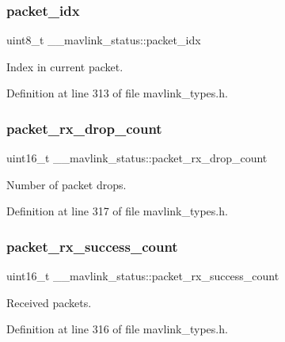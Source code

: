 \subsubsection{\texorpdfstring{packet\_idx}{packet\_idx}}
{\footnotesize\ttfamily uint8\+\_\+t \+\_\+\+\_\+mavlink\+\_\+status\+::packet\+\_\+idx}



Index in current packet. 



Definition at line 313 of file mavlink\+\_\+types.\+h.

\mbox{\label{struct____mavlink__status_a1a1f510b9484e705c971f20fd1d61912}} 
\subsubsection{\texorpdfstring{packet\_rx\_drop\_count}{packet\_rx\_drop\_count}}
{\footnotesize\ttfamily uint16\+\_\+t \+\_\+\+\_\+mavlink\+\_\+status\+::packet\+\_\+rx\+\_\+drop\+\_\+count}



Number of packet drops. 



Definition at line 317 of file mavlink\+\_\+types.\+h.

\mbox{\label{struct____mavlink__status_aa088f67773cdf9ff541c5880e65cee68}} 
\subsubsection{\texorpdfstring{packet\_rx\_success\_count}{packet\_rx\_success\_count}}
{\footnotesize\ttfamily uint16\+\_\+t \+\_\+\+\_\+mavlink\+\_\+status\+::packet\+\_\+rx\+\_\+success\+\_\+count}



Received packets. 



Definition at line 316 of file mavlink\+\_\+types.\+h.

\mbox{\label{struct____mavlink__status_ae7a52aa0c84929dbf181220c689f9ec8}} 
